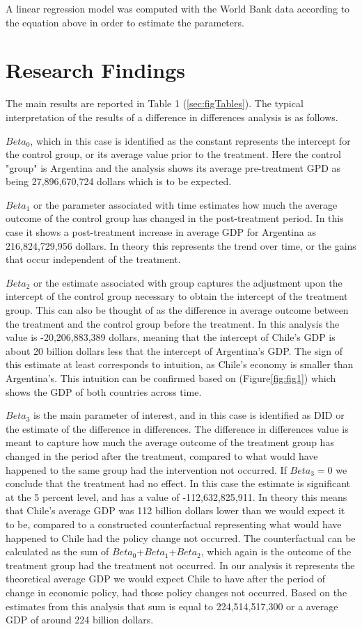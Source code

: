 \documentclass[12pt,english]{article}
\begin{document}
A linear regression model was computed with the World Bank data according to the equation above in order to estimate the parameters. 

\section{Research Findings}\label{sec:results}
The main results are reported in Table 1 (\ref{sec:figTables}). The typical interpretation of the results of a difference in differences analysis is as follows. 

$Beta_0$, which in this case is identified as the constant represents the intercept for the control group, or its average value prior to the treatment. Here the control "group" is Argentina and the analysis shows its average pre-treatment GPD as being 27,896,670,724 dollars which is to be expected.

$Beta_1$ or the parameter associated with time estimates how much the average outcome of the control group has changed in the post-treatment period. In this case it shows a post-treatment increase in average GDP for Argentina as 216,824,729,956 dollars. In theory this represents the trend over time, or the gains that occur independent of the treatment. 

$Beta_2$ or the estimate associated with group captures the adjustment upon the intercept of the control group necessary to obtain the intercept of the treatment group. This can also be thought of as the difference in average outcome between the treatment and the control group before the treatment. In this analysis the value is -20,206,883,389 dollars, meaning that the intercept of Chile's GDP is about 20 billion dollars less that the intercept of Argentina's GDP. The sign of this estimate at least corresponds to intuition, as Chile's economy is smaller than Argentina's. This intuition can be confirmed based on (Figure\ref{fig:fig1}) which shows the GDP of both countries across time. 

$Beta_3$ is the main parameter of interest, and in this case is identified as DID or the estimate of the difference in differences. The difference in differences value is meant to capture how much the average outcome of the treatment group has changed in the period after the treatment, compared to what would have happened to the same group had the intervention not occurred. If $Beta_3=0$ we conclude that the treatment had no effect. In this case the estimate is significant at the 5 percent level, and has a value of -112,632,825,911. In theory this means that Chile's average GDP was 112 billion dollars lower than we would expect it to be, compared to a constructed counterfactual representing what would have happened to Chile had the policy change not occurred. The counterfactual can be calculated as the sum of $Beta_0$+$Beta_1$+$Beta_2$, which again is the outcome of the treatment group had the treatment not occurred. In our analysis it represents the theoretical average GDP we would expect Chile to have after the period of change in economic policy, had those policy changes not occurred. Based on the estimates from this analysis that sum is equal to 224,514,517,300 or a average GDP of around 224 billion dollars. 
\end{document}
